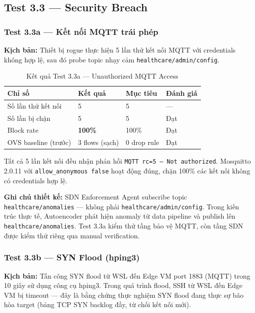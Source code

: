 \subsection{Test 3.3 — Security Breach}

\subsubsection{Test 3.3a — Kết nối MQTT trái phép}

\textbf{Kịch bản:} Thiết bị rogue thực hiện 5 lần thử kết nối MQTT với credentials không hợp lệ, sau đó probe topic nhạy cảm \texttt{healthcare/admin/config}.

\begin{table}[htbp]
\caption{Kết quả Test 3.3a — Unauthorized MQTT Access}
\label{tab:test33a}
\centering
\begin{tabular}{llll}
\toprule
\textbf{Chỉ số} & \textbf{Kết quả} & \textbf{Mục tiêu} & \textbf{Đánh giá} \\
\midrule
Số lần thử kết nối     & 5     & 5     & — \\
Số lần bị chặn         & 5     & 5     & Đạt \\
Block rate             & \textbf{100\%} & 100\% & Đạt \\
OVS baseline (trước)   & 3 flows (sạch) & 0 drop rule & Đạt \\
\bottomrule
\end{tabular}
\end{table}

Tất cả 5 lần kết nối đều nhận phản hồi \texttt{MQTT rc=5 — Not authorized}. Mosquitto 2.0.11 với \texttt{allow\_anonymous false} hoạt động đúng, chặn 100\% các kết nối không có credentials hợp lệ.

\textbf{Ghi chú thiết kế:} SDN Enforcement Agent subscribe topic \texttt{healthcare/anomalies} — không phải \texttt{healthcare/admin/config}. Trong kiến trúc thực tế, Autoencoder phát hiện anomaly từ data pipeline và publish lên \texttt{healthcare/anomalies}. Test 3.3a kiểm thử tầng bảo vệ MQTT, còn tầng SDN được kiểm thử riêng qua manual verification.

\subsubsection{Test 3.3b — SYN Flood (hping3)}

\textbf{Kịch bản:} Tấn công SYN flood từ WSL đến Edge VM port 1883 (MQTT) trong 10 giây sử dụng công cụ hping3. Trong quá trình flood, SSH từ WSL đến Edge VM bị timeout — đây là bằng chứng thực nghiệm SYN flood đang thực sự bão hòa target (bảng TCP SYN backlog đầy, từ chối kết nối mới).

